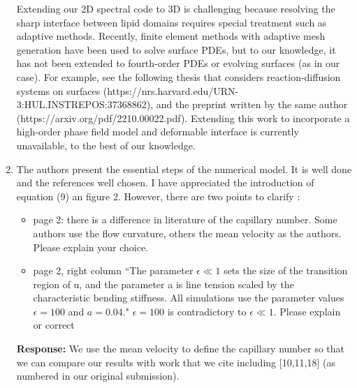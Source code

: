 \documentclass[11pt]{article}
\begin{document}
\begin{enumerate}
Extending our 2D spectral code to 3D is challenging because resolving
the sharp interface between lipid domains requires special treatment
such as adaptive methods. Recently, finite element methods with adaptive
mesh generation have been used to solve surface PDEs, but to our
knowledge, it has not been extended to fourth-order PDEs or evolving
surfaces (as in our case). For example, see the following thesis that
considers reaction-diffusion systems on surfaces
(https://nrs.harvard.edu/URN-3:HUL.INSTREPOS:37368862), and the preprint
written by the same author (https://arxiv.org/pdf/2210.00022.pdf).
Extending this work to incorporate a high-order phase field model and
deformable interface is currently unavailable, to the best of our
knowledge.


%

\item The authors present the essential steps of the numerical model. It
  is well done and the references well chosen. I have appreciated the
    introduction of equation (9) an figure 2. However, there are two
    points to clarify :
    \begin{itemize}
      \item page 2: there is a difference in literature of the
        capillary number. Some authors use the flow curvature, others
        the mean velocity as the authors. Please explain your choice.
      \item page 2, right column ``The parameter $\epsilon \ll 1$ sets
        the size of the transition region of u, and the parameter a is
        line tension scaled by the characteristic bending stiffness. All
        simulations use the parameter values $\epsilon = 100$ and $a =
        0.04.$" $\epsilon = 100$ is contradictory to $\epsilon \ll 1$.
        Please explain or correct
    \end{itemize}

\noindent
{\bf Response:}  We use the mean velocity to define the capillary number
so that we can compare our results with work that we cite including
[10,11,18] (as numbered in our original submission).



\end{enumerate}
\end{document}
